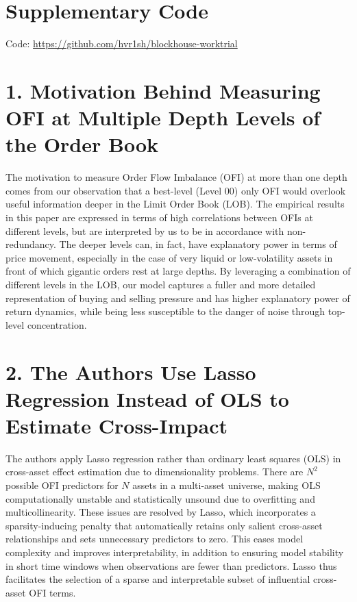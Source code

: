 \documentclass{article}
\begin{document}
\section*{Supplementary Code}
Code: \url{https://github.com/hvr1sh/blockhouse-worktrial}

\section*{1. Motivation Behind Measuring OFI at Multiple Depth Levels of the Order Book}
The motivation to measure Order Flow Imbalance (OFI) at more than one depth comes from our observation that a best-level (Level 00) only OFI would overlook useful information deeper in the Limit Order Book (LOB). The empirical results in this paper are expressed in terms of high correlations between OFIs at different levels, but are interpreted by us to be in accordance with non-redundancy. The deeper levels can, in fact, have explanatory power in terms of price movement, especially in the case of very liquid or low-volatility assets in front of which gigantic orders rest at large depths. By leveraging a combination of different levels in the LOB, our model captures a fuller and more detailed representation of buying and selling pressure and has higher explanatory power of return dynamics, while being less susceptible to the danger of noise through top-level concentration.

\section*{2. The Authors Use Lasso Regression Instead of OLS to Estimate Cross-Impact}
The authors apply Lasso regression rather than ordinary least squares (OLS) in cross-asset effect estimation due to dimensionality problems. There are $N^2$ possible OFI predictors for $N$ assets in a multi-asset universe, making OLS computationally unstable and statistically unsound due to overfitting and multicollinearity. These issues are resolved by Lasso, which incorporates a sparsity-inducing penalty that automatically retains only salient cross-asset relationships and sets unnecessary predictors to zero. This eases model complexity and improves interpretability, in addition to ensuring model stability in short time windows when observations are fewer than predictors. Lasso thus facilitates the selection of a sparse and interpretable subset of influential cross-asset OFI terms.
\end{document}
